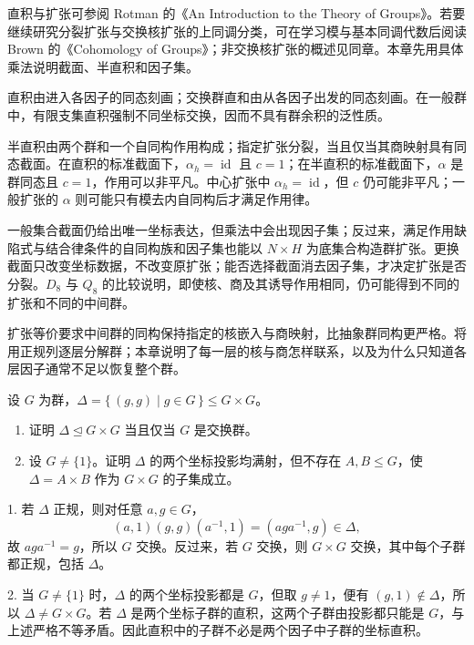 \ProseParagraphBreak
直积与扩张可参阅 Rotman 的《An Introduction to the Theory of Groups》\cite[Chapters 6--7]{Rotman1995TheoryGroups}。若要继续研究分裂扩张与交换核扩张的上同调分类，可在学习模与基本同调代数后阅读 Brown 的《Cohomology of Groups》\cite[Chapter IV, \S\S~2--3, pp. 87--96]{Brown1982CohomologyGroups}；非交换核扩张的概述见同章\cite[Chapter IV, \S~6, pp. 104--106]{Brown1982CohomologyGroups}。本章先用具体乘法说明截面、半直积和因子集。






\begin{chaptersummary}
	直积由进入各因子的同态刻画；交换群直和由从各因子出发的同态刻画。在一般群中，有限支集直积强制不同坐标交换，因而不具有群余积的泛性质。

	\ProseParagraphBreak
	半直积由两个群和一个自同构作用构成；指定扩张分裂，当且仅当其商映射具有同态截面。在直积的标准截面下，\(\alpha_h=\operatorname{id}\) 且 \(c=1\)；在半直积的标准截面下，\(\alpha\) 是群同态且 \(c=1\)，作用可以非平凡。中心扩张中 \(\alpha_h=\operatorname{id}\)，但 \(c\) 仍可能非平凡；一般扩张的 \(\alpha\) 则可能只有模去内自同构后才满足作用律。

	\ProseParagraphBreak
	一般集合截面仍给出唯一坐标表达，但乘法中会出现因子集；反过来，满足作用缺陷式与结合律条件的自同构族和因子集也能以 \(N\times H\) 为底集合构造群扩张。更换截面只改变坐标数据，不改变原扩张；能否选择截面消去因子集，才决定扩张是否分裂。\(D_8\) 与 \(Q_8\) 的比较说明，即使核、商及其诱导作用相同，仍可能得到不同的扩张和不同的中间群。

	\ProseParagraphBreak
	扩张等价要求中间群的同构保持指定的核嵌入与商映射，比抽象群同构更严格。将用正规列逐层分解群；本章说明了每一层的核与商怎样联系，以及为什么只知道各层因子通常不足以恢复整个群。
\end{chaptersummary}

\BookExercises

\begin{exercise}\label{b1:ex:06-1}
	设 \(G\) 为群，\(\Delta=\bigl\{\,(g,g)\mid g\in G\,\bigr\}\leq G\times G\)。
	\begin{enumerate}
		\item 证明 \(\Delta\trianglelefteq G\times G\) 当且仅当 \(G\) 是交换群。
		\item 设 \(G\neq\{1\}\)。证明 \(\Delta\) 的两个坐标投影均满射，但不存在 \(A,B\leq G\)，使 \(\Delta=A\times B\) 作为 \(G\times G\) 的子集成立。
	\end{enumerate}
\end{exercise}
\begin{solution}
	1. 若 \(\Delta\) 正规，则对任意 \(a,g\in G\)，
	\[
		(a,1)(g,g)(a^{-1},1)=(aga^{-1},g)\in\Delta,
	\]
	故 \(aga^{-1}=g\)，所以 \(G\) 交换。反过来，若 \(G\) 交换，则 \(G\times G\) 交换，其中每个子群都正规，包括 \(\Delta\)。

	2. 当 \(G\neq\{1\}\) 时，\(\Delta\) 的两个坐标投影都是 \(G\)，但取 \(g\neq1\)，便有 \((g,1)\notin\Delta\)，所以 \(\Delta\neq G\times G\)。若 \(\Delta\) 是两个坐标子群的直积，这两个子群由投影都只能是 \(G\)，与上述严格不等矛盾。因此直积中的子群不必是两个因子中子群的坐标直积。
\end{solution}

